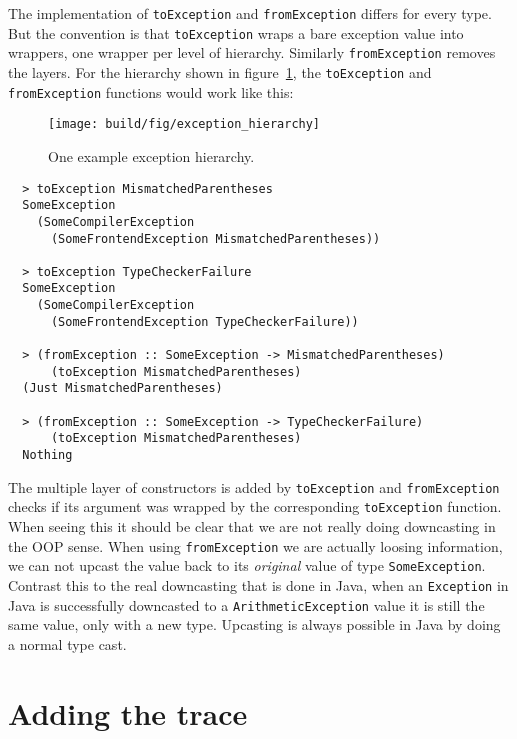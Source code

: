 The implementation of \texttt{toException} and \texttt{fromException}
differs for every type. But the convention is that \texttt{toException}
wraps a bare exception value into wrappers, one wrapper per level of
hierarchy. Similarly \texttt{fromException} removes the layers. For the
hierarchy shown in figure~\ref{fig:exception_hierarchy}, the
\texttt{toException} and \texttt{fromException} functions would work
like this:

\begin{figure}
\begin{mdframed}
  \texttt{[image: build/fig/exception\_hierarchy]}
  \caption{One example exception hierarchy.}
  \label{fig:exception_hierarchy}
\end{mdframed}
\end{figure}

\begin{verbatim}
  > toException MismatchedParentheses
  SomeException
    (SomeCompilerException
      (SomeFrontendException MismatchedParentheses))

  > toException TypeCheckerFailure
  SomeException
    (SomeCompilerException
      (SomeFrontendException TypeCheckerFailure))

  > (fromException :: SomeException -> MismatchedParentheses)
      (toException MismatchedParentheses)
  (Just MismatchedParentheses)

  > (fromException :: SomeException -> TypeCheckerFailure)
      (toException MismatchedParentheses)
  Nothing
\end{verbatim}

The multiple layer of constructors is added by \texttt{toException}
and \texttt{fromException} checks if its argument was wrapped by the
corresponding \texttt{toException} function. When seeing this it should
be clear that we are not really doing downcasting in the OOP sense. When using
\texttt{fromException} we are actually loosing information, we
can not upcast the value back to its \emph{original} value of type
\texttt{SomeException}. Contrast this to the real downcasting that is
done in Java, when an \texttt{Exception} in Java is successfully
downcasted to a \texttt{ArithmeticException} value it is still the same
value, only with a new type. Upcasting is always possible in Java by
doing a normal type cast.






\section{Adding the trace} \label{sec:adding_the_trace}

